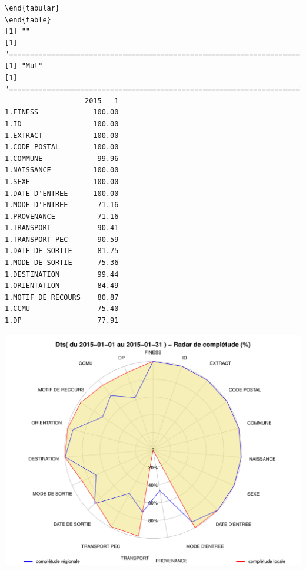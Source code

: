 \documentclass[]{article}
\begin{document}
\begin{verbatim}
\end{tabular} 
\end{table} 
[1] ""
[1] "====================================================================="
[1] "Mul"
[1] "====================================================================="
                   2015 - 1
1.FINESS             100.00
1.ID                 100.00
1.EXTRACT            100.00
1.CODE POSTAL        100.00
1.COMMUNE             99.96
1.NAISSANCE          100.00
1.SEXE               100.00
1.DATE D'ENTREE      100.00
1.MODE D'ENTREE       71.16
1.PROVENANCE          71.16
1.TRANSPORT           90.41
1.TRANSPORT PEC       90.59
1.DATE DE SORTIE      81.75
1.MODE DE SORTIE      75.36
1.DESTINATION         99.44
1.ORIENTATION         84.49
1.MOTIF DE RECOURS    80.87
1.CCMU                75.40
1.DP                  77.91
\end{verbatim}

\includegraphics{completude_files/figure-latex/finess-4.pdf}
\end{document}
